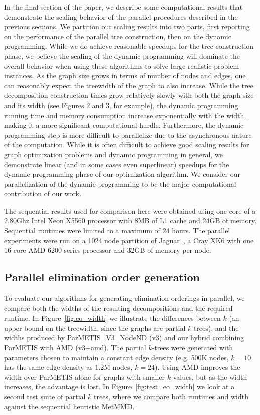 \documentclass[conference]{IEEEtran}
\begin{document}
In the final section of the paper, we describe some
computational results that demonstrate the scaling behavior
of the parallel procedures described in the previous sections.
We partition our scaling results into two parts, first reporting on the performance of the parallel tree
construction, then on the dynamic programming.  While we do achieve reasonable speedups
for the tree construction phase, we believe the scaling of the dynamic programming will
dominate the overall behavior when using these algorithms to solve large realistic problem instances.
As the graph size grows in terms of number of nodes and edges, one can reasonably
expect the treewidth of the graph to also increase.  While the tree decomposition
construction times grow relatively slowly with both the graph size and its width
(see Figures 2 and 3, for example), the dynamic programming running time and
memory consumption increase exponentially with the width, making it a more
significant computational hurdle.  Furthermore, the dynamic programming step
is more difficult to parallelize due to the asynchronous nature of the computation.
While it is often difficult to achieve good scaling results for graph optimization problems
and dynamic programming in general, we demonstrate linear (and in some cases even superlinear)
speedups for the dynamic programming phase of our optimization algorithm.
We consider our parallelization of the dynamic programming to be the major
computational contribution of our work.

The sequential results used for comparison here were obtained using one core of a
2.80Ghz Intel Xeon X5560 %
processor with 8MB of L1 cache and 24GB of memory. Sequential runtimes were limited to a maximum of
24 hours. The parallel experiments were run on a 1024 node partition of Jaguar~\cite{jaguar}, a Cray XK6 with one 16-core AMD 6200 series processor and 32GB of memory per node.


\subsection{Parallel elimination order generation}\label{sec:exp_elimination_order}
To evaluate our algorithms for generating elimination orderings in parallel,
we compare both the widths of the resulting decompositions and the required runtime.
In Figure~\ref{fig:eo_width} we illustrate the differences between $k$ (an upper bound on the treewidth,
since the graphs are partial $k$-trees), and the widths produced by ParMETIS\_V3\_NodeND (v3) and our hybrid combining ParMETIS with AMD (v3+amd). The partial $k$-trees were
generated with parameters chosen to maintain a constant edge density
(e.g. 500K nodes, $k = 10$ has the same edge density as 1.2M nodes, $k = 24$).
Using AMD improves the width over ParMETIS alone for graphs with smaller $k$ values, but
as the width increases, the advantage is lost.
In Figure~\ref{fig:test_eo_width} we look at a second test suite of
partial $k$ trees, where we compare both runtimes and width against the sequential heuristic MetMMD.
\end{document}
